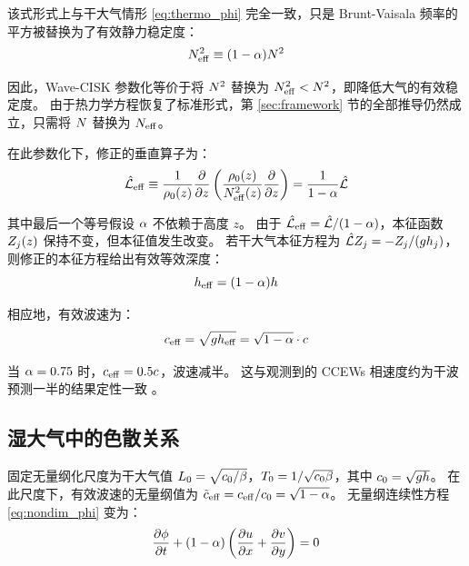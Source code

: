 该式形式上与干大气情形 \eqref{eq:thermo_phi} 完全一致，只是 Brunt-Vaisala 频率的平方被替换为了有效静力稳定度：
\begin{equation}
    N_{\mathrm{eff}}^2 \equiv (1 - \alpha)N^2
    \label{eq:effective_stability}
\end{equation}

因此，Wave-CISK 参数化等价于将 $N^2$ 替换为 $N_{\mathrm{eff}}^2 < N^2$，即降低大气的有效稳定度。
由于热力学方程恢复了标准形式，第 \ref{sec:framework} 节的全部推导仍然成立，只需将 $N$ 替换为 $N_{\mathrm{eff}}$。

在此参数化下，修正的垂直算子为：
\begin{equation}
    \vertop_{\mathrm{eff}} \equiv \frac{1}{\density_0(z)}\pde{}{z}\left(\frac{\density_0(z)}{\bvfreq_{\mathrm{eff}}^2(z)}\pde{}{z}\right) = \frac{1}{1 - \moistparam}\vertop
    \label{eq:effective_operator}
\end{equation}

其中最后一个等号假设 $\alpha$ 不依赖于高度 $z$。
由于 $\hat{\mathcal{L}}_{\mathrm{eff}} = \hat{\mathcal{L}}/(1-\alpha)$，本征函数 $Z_j(z)$ 保持不变，但本征值发生改变。
若干大气本征方程为 $\hat{\mathcal{L}}Z_j = -Z_j/(gh_j)$，则修正的本征方程给出有效等效深度：
\begin{equation}
    h_{\mathrm{eff}} = (1 - \alpha)h
    \label{eq:effective_equivalent_depth}
\end{equation}

相应地，有效波速为：
\begin{equation}
    c_{\mathrm{eff}} = \sqrt{gh_{\mathrm{eff}}} = \sqrt{1 - \alpha}\cdot c
    \label{eq:effective_wave_speed}
\end{equation}

当 $\alpha = 0.75$ 时，$c_{\mathrm{eff}} = 0.5c$，波速减半。
这与观测到的 CCEWs 相速度约为干波预测一半的结果定性一致 \citep{kiladisConvectivelyCoupledEquatorial2009, lindzenWaveCISKTropics1974}。

\subsection{湿大气中的色散关系}
\label{subsec:modified_dispersion}

固定无量纲化尺度为干大气值 $L_0 = \sqrt{c_0/\beta}$，$T_0 = 1/\sqrt{c_0\beta}$，其中 $c_0 = \sqrt{gh}$。
在此尺度下，有效波速的无量纲值为 $\tilde{c}_{\mathrm{eff}} = c_{\mathrm{eff}}/c_0 = \sqrt{1 - \alpha}$。
无量纲连续性方程 \eqref{eq:nondim_phi} 变为：
\begin{equation}
    \pde{\gravpotential}{\timevar} + (1 - \moistparam)\left(\pde{u}{x} + \pde{v}{y}\right) = 0
\end{equation}

